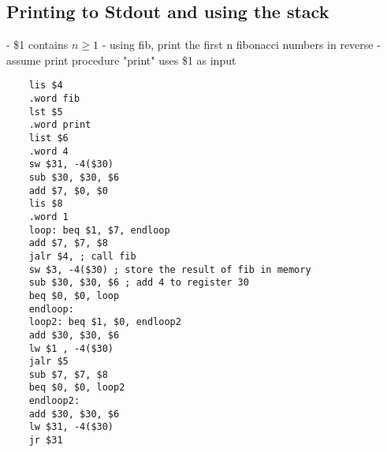 \documentclass[12pt]{article}
\begin{document}
	\subsection*{Printing to Stdout and using the stack}
	- \$1 contains $n \geq 1$
	- using fib, print the first n fibonacci numbers in reverse
	- assume print procedure "print" uses \$1 as input
	
	\begin{lstlisting}
	lis $4
	.word fib
	lst $5
	.word print
	list $6
	.word 4
	sw $31, -4($30)
	sub $30, $30, $6
	add $7, $0, $0
	lis $8
	.word 1
	loop: beq $1, $7, endloop 
	add $7, $7, $8
	jalr $4, ; call fib
	sw $3, -4($30) ; store the result of fib in memory
	sub $30, $30, $6 ; add 4 to register 30
	beq $0, $0, loop
	endloop: 
	loop2: beq $1, $0, endloop2
	add $30, $30, $6
	lw $1 , -4($30)
	jalr $5
	sub $7, $7, $8
	beq $0, $0, loop2
	endloop2:
	add $30, $30, $6
	lw $31, -4($30)
	jr $31
	\end{lstlisting}
	
\end{document}
